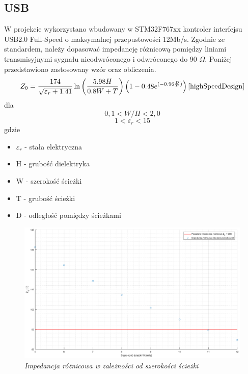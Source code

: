 \documentclass[eng,printmode]{mgr}
\begin{document}
\subsection*{USB}
W projekcie wykorzystano wbudowany w STM32F767xx kontroler interfejsu USB2.0 Full-Speed o maksymalnej przepustowości 12Mb/s. Zgodnie ze standardem, należy dopasować impedancję różnicową pomiędzy liniami transmisyjnymi sygnału nieodwróconego i odwróconego do 90 \textbf{$\Omega$}. Poniżej przedstawiono zastosowany wzór oraz obliczenia.
\begin{equation}
Z_0= \frac{174}{\sqrt{\varepsilon_r + 1.41}}\ln{\left(\frac{5.98H}{0.8W + T}\right)} \left(1-0.48e^{(-0.96\frac{D}{H})}\right) \label{eq:usb_zd} \cite{highSpeedDesign}
\end{equation}
dla 
$$
0,1 < W/H < 2,0
$$
$$
1 < \varepsilon_r < 15
$$
gdzie
\begin{itemize}
  \item \textbf{$\varepsilon_r$} - stała elektryczna
  \item H - grubość dielektryka
  \item W - szerokość ścieżki
  \item T - grubość ścieżki
  \item D - odległość pomiędzy ścieżkami
\end{itemize}

\begin{figure}[!h]
    \centering
    \includegraphics[width=\textwidth]{plots/usbzD.png}
    \caption{\textit{Impedancja różnicowa w zależności od szerokości ścieżki}}
\end{figure}
\end{document}
